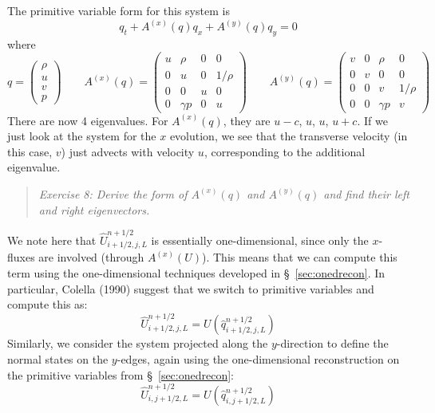\documentclass[11pt]{article}
\begin{document}
The primitive variable form for this system is
\begin{equation}
q_t + A^{(x)}(q) q_x + A^{(y)}(q) q_y = 0
\end{equation}
where
\begin{equation}
q = \left ( \begin{array}{c} \rho \\ u \\ v \\ p \end{array} \right )
%
\qquad
A^{(x)}(q) = \left ( \begin{array}{cccc} u  & \rho     & 0 &  0 \\
                                         0  &  u       & 0 &  1/\rho \\
                                         0  &  0       & u &  0 \\
                                         0  & \gamma p & 0 &  u \end{array} \right )
\qquad
A^{(y)}(q) = \left ( \begin{array}{cccc} v  & 0 & \rho &  0 \\
                                         0  & v & 0    &  0 \\
                                         0  & 0 & v    &  1/\rho \\
                                         0  & 0 & \gamma p & v \end{array} \right )
\end{equation}
There are now 4 eigenvalues.  For $A^{(x)}(q)$, they are $u-c$, $u$,
$u$, $u+c$.  If we just look at the system for the $x$ evolution, we
see that the transverse velocity (in this case, $v$) just advects with
velocity $u$, corresponding to the additional eigenvalue.
\begin{quote}
{\em Exercise 8: 
Derive the form of $A^{(x)}(q)$ and $A^{(y)}(q)$ and find their left and right eigenvectors.}
\end{quote}

We note here that $\hat{U}_{i+1/2,j,L}^{n+1/2}$ is essentially
one-dimensional, since only the $x$-fluxes are involved (through
$A^{(x)}(U)$).  This means that we can compute this term using the
one-dimensional techniques developed in \S~\ref{sec:onedrecon}.  In
particular, Colella (1990) suggest that we switch to primitive variables
and compute this as:
\begin{equation}
\hat{U}_{i+1/2,j,L}^{n+1/2} = U(\hat{q}_{i+1/2,j,L}^{n+1/2})
\end{equation}
Similarly, we consider the system projected along the $y$-direction to
define the normal states on the $y$-edges, again using the one-dimensional
reconstruction on the primitive variables from \S~\ref{sec:onedrecon}:
\begin{equation}
\hat{U}_{i,j+1/2,L}^{n+1/2} = U(\hat{q}_{i,j+1/2,L}^{n+1/2})
\end{equation}
\end{document}
